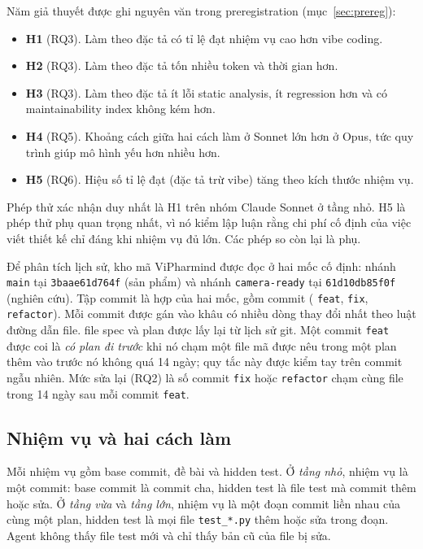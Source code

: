 Năm giả thuyết được ghi nguyên văn trong preregistration (mục~\ref{sec:prereg}):
\begin{itemize}
\item \textbf{H1} (RQ3). Làm theo đặc tả có tỉ lệ đạt nhiệm vụ cao hơn vibe coding.
\item \textbf{H2} (RQ3). Làm theo đặc tả tốn nhiều token và thời gian hơn.
\item \textbf{H3} (RQ3). Làm theo đặc tả ít lỗi static analysis, ít regression hơn và có maintainability index không kém hơn.
\item \textbf{H4} (RQ5). Khoảng cách giữa hai cách làm ở Sonnet lớn hơn ở Opus, tức quy trình giúp mô hình yếu
hơn nhiều hơn.
\item \textbf{H5} (RQ6). Hiệu số tỉ lệ đạt (đặc tả trừ vibe) tăng theo kích thước nhiệm vụ.
\end{itemize}
Phép thử xác nhận duy nhất là H1 trên nhóm Claude Sonnet ở tầng nhỏ. H5 là phép thử phụ quan trọng nhất, vì
nó kiểm lập luận rằng chi phí cố định của việc viết thiết kế chỉ đáng khi nhiệm vụ đủ lớn. Các phép so còn
lại là phụ.

Để phân tích lịch sử, kho mã ViPharmind được đọc ở hai mốc cố định: nhánh \texttt{main} tại \texttt{3baae61d764f} (sản phẩm) và
nhánh \texttt{camera-ready} tại \texttt{61d10db85f0f} (nghiên cứu). Tập commit là hợp của hai mốc, gồm
\NumCommits{} commit (\NumCommitsFeat{} \texttt{feat}, \NumCommitsFix{} \texttt{fix},
\NumCommitsRefactor{} \texttt{refactor}). Mỗi commit được gán vào khâu có nhiều dòng thay đổi nhất theo luật
đường dẫn file. \NumSpecPlanFiles{} file spec và plan được lấy lại từ lịch sử git. Một commit \texttt{feat}
được coi là \emph{có plan đi trước} khi nó chạm một file mã được nêu trong một plan thêm vào trước nó không quá
14 ngày; quy tắc này được kiểm tay trên \NumLinkChecked{} commit ngẫu nhiên. Mức sửa lại (RQ2) là số commit
\texttt{fix} hoặc \texttt{refactor} chạm cùng file trong 14 ngày sau mỗi commit \texttt{feat}.

\subsection{Nhiệm vụ và hai cách làm}\label{sec:tasks}

Mỗi nhiệm vụ gồm base commit, đề bài và hidden test. Ở \emph{tầng nhỏ}, nhiệm vụ là một commit: base commit là commit cha,
hidden test là file test mà commit thêm hoặc sửa. Ở \emph{tầng vừa} và \emph{tầng lớn}, nhiệm vụ là một đoạn
commit liền nhau của cùng một plan, hidden test là mọi file \texttt{test\_*.py} thêm hoặc sửa trong đoạn. Agent
không thấy file test mới và chỉ thấy bản cũ của file bị sửa.


